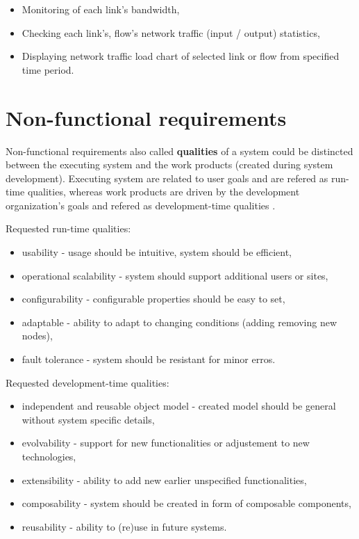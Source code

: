 \documentclass[11pt]{book}
\begin{document}
		\begin{itemize}
			\item{Monitoring of each link's bandwidth, }
			\item{Checking each link's, flow's network traffic (input / output) statistics, }
			\item{Displaying network traffic load chart of selected link or flow from specified time period. }
		\end{itemize}

    \section{Non-functional requirements}
		\label{sec:req:nonfunc}

	
		Non-functional requirements also called \textbf{qualities} of a system could be distincted between 
		the executing system and the work products (created during system development). Executing system are related
		to user goals and are refered as run-time qualities, whereas work products are driven by the development organization’s
		goals and refered as development-time qualities \cite{nonfunctional}. 

                \medskip
		
		Requested run-time qualities:
		\begin{itemize}
			\item{usability - usage should be intuitive, system should be efficient,}
			\item{operational scalability - system should support additional users or sites, }
			\item{configurability - configurable properties should be easy to set,}
			\item{adaptable - ability to adapt to changing conditions (adding removing new nodes),}
			\item{fault tolerance - system should be resistant for minor erros.}
		\end{itemize}
		
		\medskip
		
		Requested development-time qualities:
		\begin{itemize}
			\item{independent and reusable object model - created model should be general without system specific details, }
			\item{evolvability - support for new functionalities or adjustement to new technologies,}
			\item{extensibility - ability to add new earlier unspecified functionalities, }
			\item{composability - system should be created in form of composable components, }
			\item{reusability - ability to (re)use in future systems.}
		\end{itemize}
		
\end{document}
